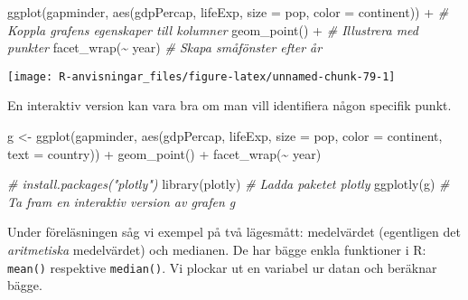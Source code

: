\documentclass[
]{book}
\newenvironment{Shaded}{\begin{snugshade}}{\end{snugshade}}
\newcommand{\AttributeTok}[1]{\textcolor[rgb]{0.77,0.63,0.00}{#1}}
\newcommand{\CommentTok}[1]{\textcolor[rgb]{0.56,0.35,0.01}{\textit{#1}}}
\newcommand{\FunctionTok}[1]{\textcolor[rgb]{0.00,0.00,0.00}{#1}}
\newcommand{\NormalTok}[1]{#1}
\newcommand{\OtherTok}[1]{\textcolor[rgb]{0.56,0.35,0.01}{#1}}
\newcommand{\SpecialCharTok}[1]{\textcolor[rgb]{0.00,0.00,0.00}{#1}}
\theoremstyle{definition}
\theoremstyle{definition}
\theoremstyle{definition}
\theoremstyle{definition}
\theoremstyle{remark}
\begin{document}
\begin{Shaded}
\begin{Highlighting}[]
\FunctionTok{ggplot}\NormalTok{(gapminder, }\FunctionTok{aes}\NormalTok{(gdpPercap, lifeExp, }\AttributeTok{size =}\NormalTok{ pop, }\AttributeTok{color =}\NormalTok{ continent)) }\SpecialCharTok{+}    \CommentTok{\# Koppla grafens egenskaper till kolumner}
  \FunctionTok{geom\_point}\NormalTok{() }\SpecialCharTok{+}                                                               \CommentTok{\# Illustrera med punkter}
  \FunctionTok{facet\_wrap}\NormalTok{(}\SpecialCharTok{\textasciitilde{}}\NormalTok{ year)                                                           }\CommentTok{\# Skapa småfönster efter år}
\end{Highlighting}
\end{Shaded}

\begin{center}\texttt{[image: R-anvisningar\_files/figure-latex/unnamed-chunk-79-1]} \end{center}

En interaktiv version kan vara bra om man vill identifiera någon specifik punkt.

\begin{Shaded}
\begin{Highlighting}[]
\NormalTok{g }\OtherTok{\textless{}{-}} \FunctionTok{ggplot}\NormalTok{(gapminder, }\FunctionTok{aes}\NormalTok{(gdpPercap, lifeExp, }\AttributeTok{size =}\NormalTok{ pop, }\AttributeTok{color =}\NormalTok{ continent, }\AttributeTok{text =}\NormalTok{ country)) }\SpecialCharTok{+}
  \FunctionTok{geom\_point}\NormalTok{() }\SpecialCharTok{+}
  \FunctionTok{facet\_wrap}\NormalTok{(}\SpecialCharTok{\textasciitilde{}}\NormalTok{ year)}

\CommentTok{\# install.packages("plotly")}
\FunctionTok{library}\NormalTok{(plotly)                        }\CommentTok{\# Ladda paketet plotly}
\FunctionTok{ggplotly}\NormalTok{(g)                            }\CommentTok{\# Ta fram en interaktiv version av grafen g}
\end{Highlighting}
\end{Shaded}

Under föreläsningen såg vi exempel på två lägesmått: medelvärdet (egentligen det \emph{aritmetiska} medelvärdet) och medianen. De har bägge enkla funktioner i R: \texttt{mean()} respektive \texttt{median()}. Vi plockar ut en variabel ur datan och beräknar bägge.

\begin{Shaded}
\end{Shaded}
\end{document}
